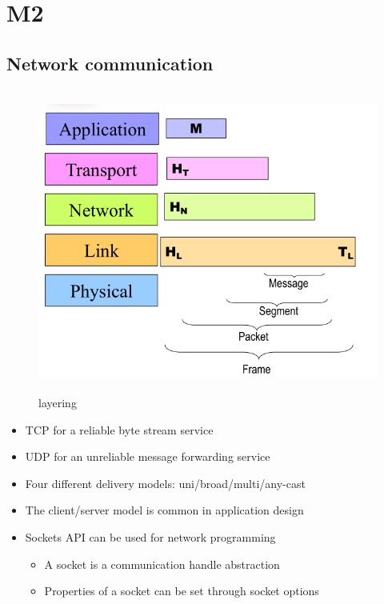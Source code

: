 \section{M2}
\subsection{Network communication}
\begin{figure}[h]
    \vspace{10mm}
    \centering
    \includegraphics[width=14cm, height=10cm]{image/layering.png}
    \caption{layering}
\end{figure}

\begin{itemize}
\item TCP for a reliable byte stream service
\item UDP for an unreliable message forwarding service
\item Four different delivery models: uni/broad/multi/any-cast
\item The client/server model is common in application design
\item Sockets API can be used for network programming
  \begin{itemize}
  \item A socket is a communication handle abstraction
  \item Properties of a socket can be set through socket options
  \end{itemize}
\end{itemize}

